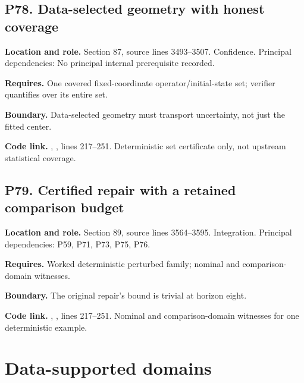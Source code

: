 \documentclass[11pt,oneside,openany]{book}
\numberwithin{equation}{section}
\begin{document}
\par\noindent\begin{minipage}{\textwidth}
\subsection{P78. Data-selected geometry with honest
coverage}\label{LSMRegister:p78.-data-selected-geometry-with-honest-coverage}

\textbf{Location and role.} Section 87, source lines 3493--3507.
Confidence. Principal dependencies: No principal internal prerequisite
recorded.

\textbf{Requires.} One covered fixed-coordinate operator/initial-state
set; verifier quantifies over its entire set.

\textbf{Boundary.} Data-selected geometry must transport uncertainty,
not just the fitted center.

\textbf{Code link.} ,
, lines 217--251. Deterministic set
certificate only, not upstream statistical coverage.
\end{minipage}\par\medskip

\par\noindent\begin{minipage}{\textwidth}
\subsection{P79. Certified repair with a retained comparison
budget}\label{LSMRegister:p79.-certified-repair-with-a-retained-comparison-budget}

\textbf{Location and role.} Section 89, source lines 3564--3595.
Integration. Principal dependencies: P59, P71, P73, P75, P76.

\textbf{Requires.} Worked deterministic perturbed family; nominal and
comparison-domain witnesses.

\textbf{Boundary.} The original repair's bound is trivial at horizon
eight.

\textbf{Code link.} ,
, lines 217--251. Nominal and
comparison-domain witnesses for one deterministic example.
\end{minipage}\par\medskip


\section{Data-supported domains}\label{LSMRegister:data-supported-domains}
\end{document}
